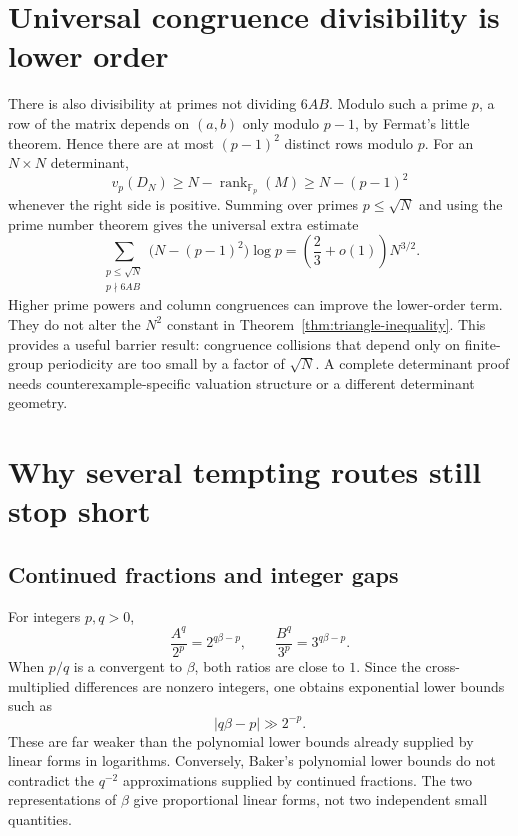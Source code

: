 \documentclass[11pt,oneside]{article}
\theoremstyle{definition}
\theoremstyle{remark}
\begin{document}
\section{Universal congruence divisibility is lower order}

There is also divisibility at primes not dividing $6AB$.  Modulo such a prime
$p$, a row of the matrix depends on $(a,b)$ only modulo $p-1$, by Fermat's
little theorem.  Hence there are at most $(p-1)^2$ distinct rows modulo $p$.
For an $N\times N$ determinant,
\[
 v_p(D_N)\ge N-\operatorname{rank}_{\mathbb F_p}(M)
 \ge N-(p-1)^2
\]
whenever the right side is positive.  Summing over primes $p\le\sqrt N$ and
using the prime number theorem gives the universal extra estimate
\begin{equation}\label{eq:congruence-gain}
 \sum_{\substack{p\le\sqrt N\\p\nmid6AB}}
  \bigl(N-(p-1)^2\bigr)\log p
 =\left(\frac23+o(1)\right)N^{3/2}.
\end{equation}
Higher prime powers and column congruences can improve the lower-order term.
They do not alter the $N^2$ constant in
Theorem~\ref{thm:triangle-inequality}.  This provides a useful barrier result:
congruence collisions that depend only on finite-group periodicity are too
small by a factor of $\sqrt N$.  A complete determinant proof needs
counterexample-specific valuation structure or a different determinant
geometry.

\section{Why several tempting routes still stop short}

\subsection{Continued fractions and integer gaps}

For integers $p,q>0$,
\[
 \frac{A^q}{2^p}=2^{q\beta-p},\qquad
 \frac{B^q}{3^p}=3^{q\beta-p}.
\]
When $p/q$ is a convergent to $\beta$, both ratios are close to $1$.  Since the
cross-multiplied differences are nonzero integers, one obtains exponential
lower bounds such as
\[
 |q\beta-p|\gg 2^{-p}.
\]
These are far weaker than the polynomial lower bounds already supplied by
linear forms in logarithms.  Conversely, Baker's polynomial lower bounds do
not contradict the $q^{-2}$ approximations supplied by continued fractions.
The two representations of $\beta$ give proportional linear forms, not two
independent small quantities.
\end{document}
